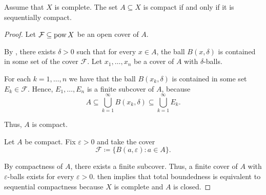 \begin{theorem}\label{thm:metric_compact_iff_sequentially_compact}
  Assume that \( X \) is complete. The set \( A \subseteq X \) is compact if and only if it is sequentially compact.
\end{theorem}
\begin{proof}
  \SufficiencySubProof Let \( \mathcal{F} \subseteq \operatorname{pow} X \) be an open cover of \( A \).

  By , there exists \( \delta > 0 \) such that for every \( x \in A \), the ball \( B(x, \delta) \) is contained in some set of the cover \( \mathcal{F} \). Let \( x_1, \ldots, x_n \) be a cover of \( A \) with \( \delta \)-balls.

  For each \( k = 1, \ldots, n \) we have that the ball \( B(x_k, \delta) \) is contained in some set \( E_k \in \mathcal{F} \). Hence, \( E_1, \ldots, E_n \) is a finite subcover of \( A \), because
  \begin{equation*}
    A \subseteq \bigcup_{k=1}^\infty B(x_k, \delta) \subseteq \bigcup_{k=1}^\infty E_k.
  \end{equation*}

  Thus, \( A \) is compact.

  \NecessitySubProof Let \( A \) be compact. Fix \( \varepsilon > 0 \) and take the cover
  \begin{equation*}
    \mathcal{F} \coloneqq \{ B(a, \varepsilon) \colon a \in A \}.
  \end{equation*}

  By compactness of \( A \), there exists a finite subcover. Thus, a finite cover of \( A \) with \( \varepsilon \)-balls exists for every \( \varepsilon > 0 \).  then implies that total boundedness is equivalent to sequential compactness because \( X \) is complete and \( A \) is closed.
\end{proof}

